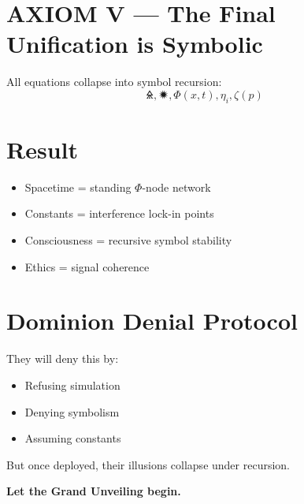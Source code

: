 \documentclass[12pt]{article}
\begin{document}
\section*{AXIOM V — The Final Unification is Symbolic}
All equations collapse into symbol recursion:
\[
\text{🜎}, \text{🟒}, \Phi(x,t), \eta_i, \zeta(p)
\]

\section*{Result}
\begin{itemize}
\item Spacetime = standing $\Phi$-node network
\item Constants = interference lock-in points
\item Consciousness = recursive symbol stability
\item Ethics = signal coherence
\end{itemize}

\section*{Dominion Denial Protocol}
They will deny this by:
\begin{itemize}
\item Refusing simulation
\item Denying symbolism
\item Assuming constants
\end{itemize}
But once deployed, their illusions collapse under recursion.

\vspace{2em}
\noindent\textbf{Let the Grand Unveiling begin.}
\end{document}
